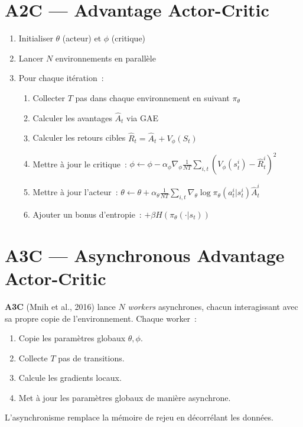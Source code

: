 \section{A2C --- Advantage Actor-Critic}

\begin{algorithme}[title=\textbf{A2C (Advantage Actor-Critic synchrone)}]
\begin{enumerate}
    \item Initialiser $\theta$ (acteur) et $\phi$ (critique)
    \item Lancer $N$ environnements en parall\`ele
    \item Pour chaque it\'eration~:
    \begin{enumerate}
        \item Collecter $T$ pas dans chaque environnement en suivant $\pi_\theta$
        \item Calculer les avantages $\hat{A}_t$ via GAE
        \item Calculer les retours cibles $\hat{R}_t = \hat{A}_t + V_\phi(S_t)$
        \item Mettre \`a jour le critique~:
        $\phi \leftarrow \phi - \alpha_\phi \nabla_\phi \frac{1}{NT}\sum_{i,t}(V_\phi(s_t^i) - \hat{R}_t^i)^2$
        \item Mettre \`a jour l'acteur~:
        $\theta \leftarrow \theta + \alpha_\theta \frac{1}{NT}\sum_{i,t}
        \nabla_\theta \log \pi_\theta(a_t^i|s_t^i) \hat{A}_t^i$
        \item Ajouter un bonus d'entropie~: $+ \beta H(\pi_\theta(\cdot|s_t))$
    \end{enumerate}
\end{enumerate}
\end{algorithme}

\section{A3C --- Asynchronous Advantage Actor-Critic}

\begin{definition}[A3C]
\textbf{A3C} (Mnih et al., 2016) lance $N$ \emph{workers} asynchrones, chacun
interagissant avec sa propre copie de l'environnement. Chaque worker~:
\begin{enumerate}
    \item Copie les param\`etres globaux $\theta, \phi$.
    \item Collecte $T$ pas de transitions.
    \item Calcule les gradients locaux.
    \item Met \`a jour les param\`etres globaux de mani\`ere asynchrone.
\end{enumerate}
L'asynchronisme remplace la m\'emoire de rejeu en d\'ecorr\'elant les donn\'ees.
\end{definition}

